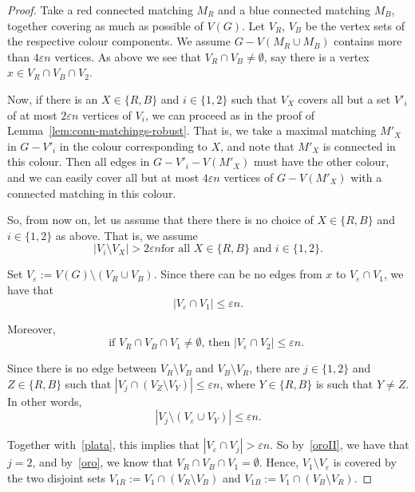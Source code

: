\documentclass[a4paper,10pt]{article}
\let\eps\varepsilon
\begin{document}
\begin{proof}
Take a red connected matching $M_R$ and a blue connected matching $M_B$, together covering as much as possible of  $V(G)$. Let $V_R$, $V_B$ be the vertex sets of the respective colour components. We assume $G-V(M_R\cup M_B)$ contains more than $4\eps n$ vertices.  As above we see that
$V_R\cap V_B\neq \emptyset$, say there is a vertex $x\in V_R\cap V_B\cap V_2$.

Now, if there is an $X\in\{R,B\}$ and $i\in\{1,2\}$ such that $V_X$ covers all but a set $V'_i$ of at most $2\eps n$ vertices of $V_i$, we can proceed as in the proof of Lemma~\ref{lem:conn-matchings-robust}. That is, we take a maximal matching $M'_X$ in $G-V'_i$ in the colour corresponding to $X$, and note that $M'_X$ is connected in this colour. Then all edges in  $G-V'_i-V(M'_X)$ must have the other colour, and we can easily cover all but at most $4\eps n$ vertices of $G-V(M'_X)$ with a connected matching in this colour.

So, from now on, let us assume that there there is no choice of $X\in\{R,B\}$ and $i\in\{1,2\}$ as above. That is, we assume
\begin{equation}\label{plata}
\text{$|V_i\setminus V_X|>2\eps n$
for all $X\in\{R,B\}$ and $i\in\{1,2\}$.}
\end{equation}

Set $V_\eps:=V(G)\setminus (V_R\cup V_B).$ Since there can be no edges from $x$ to $V_\eps\cap V_1$, we have that 
\begin{equation}\label{oroII}
|V_\eps\cap V_1|\leq\eps n.
\end{equation}
 
Moreover,
\begin{equation}\label{oro}
\text{if $V_R\cap V_B\cap V_1\neq\emptyset$, then $|V_\eps\cap V_2|\leq\eps n$. }
\end{equation}

Since there is no edge between $V_R\setminus V_B$ and $V_B\setminus V_R$, there are $j\in\{1,2\}$ and $Z\in\{R,B\}$ such that $|V_j\cap (V_Z\setminus V_Y)|\leq \eps n$, where $Y\in\{R,B\}$ is such that $Y\neq Z$. In other words, 
\begin{equation*}\label{Vj}
{|V_j\setminus (V_\eps\cup V_Y)|}\leq \eps n .
\end{equation*} 

Together with~\eqref{plata}, this implies that
$|V_\eps\cap V_j|>\eps n$.
 So by~\eqref{oroII}, we have that $j=2$, and by~\eqref{oro}, we know that $V_R\cap V_B\cap V_1=\emptyset$. Hence,  $V_1\setminus V_\eps$ is covered by the two disjoint sets 
  $V_{1R}:=V_1\cap (V_R\setminus V_B)$ and $V_{1B}:=V_1\cap (V_B\setminus V_R)$. 
  

\end{proof}
\end{document}
